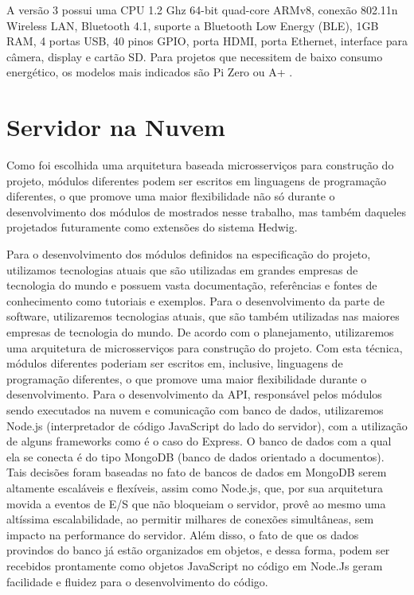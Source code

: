 A versão 3 possui uma CPU 1.2 Ghz 64-bit quad-core ARMv8, conexão 802.11n Wireless LAN, Bluetooth 4.1, suporte a Bluetooth Low Energy (BLE), 1GB RAM, 4 portas USB, 40 pinos GPIO, porta HDMI, porta Ethernet, interface para câmera, display e cartão SD. Para projetos que necessitem de baixo consumo energético, os modelos mais indicados são Pi Zero ou A+ \cite{raspPi}.

\section{Servidor na Nuvem}
Como foi escolhida uma arquitetura baseada microsserviços para construção do projeto, módulos diferentes podem ser escritos em linguagens de programação diferentes, o que promove uma maior flexibilidade não só durante o desenvolvimento dos módulos de mostrados nesse trabalho, mas também daqueles projetados futuramente como extensões do sistema Hedwig.

Para o desenvolvimento dos módulos definidos na especificação do projeto, utilizamos tecnologias atuais que são utilizadas em grandes empresas de tecnologia do mundo e possuem vasta documentação, referências e fontes de conhecimento como tutoriais e exemplos.
Para o desenvolvimento da parte de software, utilizaremos tecnologias atuais, que são também utilizadas nas maiores empresas de tecnologia do mundo. De acordo com o planejamento, utilizaremos uma arquitetura de microsserviços para construção do projeto. Com esta técnica, módulos diferentes poderiam ser escritos em, inclusive, linguagens de programação diferentes, o que promove uma maior flexibilidade durante o desenvolvimento.
Para o desenvolvimento da API, responsável pelos módulos sendo executados na nuvem e comunicação com banco de dados, utilizaremos Node.js (interpretador de código JavaScript do lado do servidor), com a utilização de alguns frameworks como é o caso do Express. O banco de dados com a qual ela se conecta é do tipo MongoDB (banco de dados orientado a documentos). Tais decisões foram baseadas no fato de bancos de dados em MongoDB serem altamente escaláveis e flexíveis, assim como Node.js, que, por sua arquitetura movida a eventos de E/S que não bloqueiam o servidor, provê ao mesmo uma altíssima escalabilidade, ao permitir milhares de conexões simultâneas, sem impacto na performance do servidor. Além disso, o fato de que os dados provindos do banco já estão organizados em objetos, e dessa forma, podem ser recebidos prontamente como objetos JavaScript no código em Node.Js geram facilidade e fluidez para o desenvolvimento do código.

